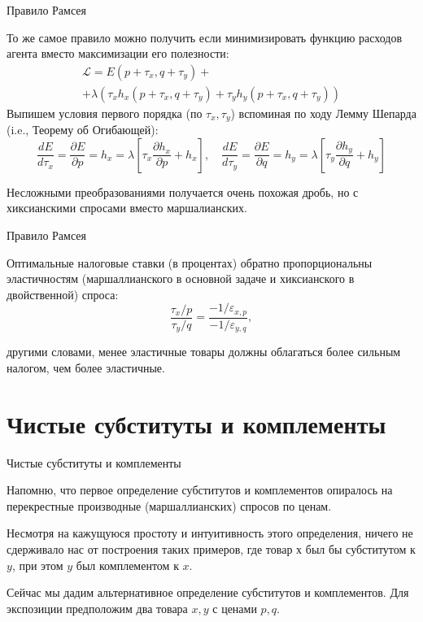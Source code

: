 \documentclass{beamer}
\begin{document}
\begin{frame}{Правило Рамсея}

То же самое правило можно получить если минимизировать функцию расходов агента вместо максимизации его полезности:
\begin{gather*}
\mathcal{L} = E(p+ \tau_x,q+\tau_y) + \\ + \lambda (\tau_x h_x(p+ \tau_x,q+\tau_y) + \tau_y h_y(p+ \tau_x,q+\tau_y))
\end{gather*}
Выпишем условия первого порядка (по $\tau_x, \tau_y$) вспоминая по ходу Лемму Шепарда (i.e., Теорему об Огибающей):
$$\frac{d E}{d \tau_x} = \frac{\partial E}{\partial p} = h_x =  \lambda [\tau_x \frac{\partial h_x}{\partial p}+h_x], \quad \frac{d E}{d \tau_y} = \frac{\partial E}{\partial q} = h_y =  \lambda [\tau_y \frac{\partial h_y}{\partial q}+h_y]$$

Несложными преобразованиями получается очень похожая дробь, но с хиксианскими спросами вместо маршалианских.

\end{frame}

\begin{frame}{Правило Рамсея}

\begin{lemma}
Оптимальные налоговые ставки (в процентах) обратно пропорциональны эластичностям (маршаллианского в основной задаче и хиксианского в двойственной) спроса:
$$ \frac{\tau_x/p}{\tau_y/q} = \frac{-1/\varepsilon_{x,p}}{-1/\varepsilon_{y,q}},$$
\end{lemma}
другими словами, менее эластичные товары должны облагаться более сильным налогом, чем более эластичные.

\end{frame}

\section{Чистые субституты и комплементы}

\begin{frame}{Чистые субституты и комплементы}

Напомню, что первое определение субститутов и комплементов опиралось на перекрестные производные (маршаллианских) спросов по ценам. 

Несмотря на кажущуюся простоту и интуитивность этого определения, ничего не сдерживало нас от построения таких примеров, где товар $х$ был бы субститутом к $y$, при этом $y$ был комплементом к $x$.

Сейчас мы дадим альтернативное определение субститутов и комплементов. Для экспозиции предположим два товара $x,y$ с ценами $p,q$.
\end{frame}
\end{document}
